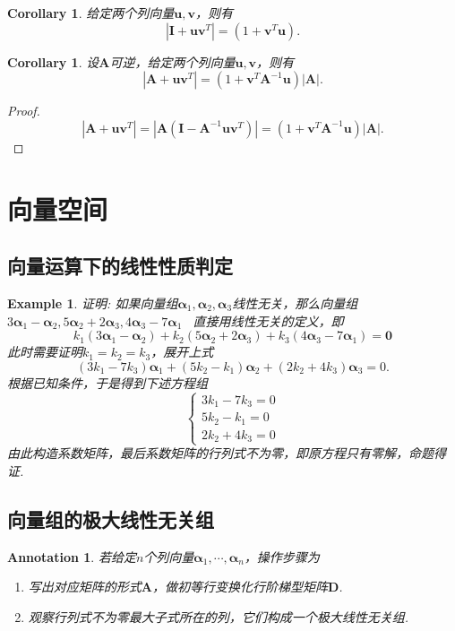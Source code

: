 \documentclass{article}
\newtheorem{corollary}[theorem]{Corollary}
\newtheorem{example}[theorem]{Example}
\newtheorem{annotation}[theorem]{Annotation}
\newcommand{\hints}{{\color{blue} \text{hints}}}
\newcommand{\mbf}[1]{\bm{#1}}
\begin{document}
\begin{corollary}
\rm 给定两个列向量$\mbf{u},\mbf{v}$，则有
$$
|\mbf{I} + \mbf{u}\mbf{v}^{T}| = (1 + \mbf{v}^{T}\mbf{u}). 
$$
\end{corollary}

\begin{corollary}
\rm 设$\mbf{A}$可逆，给定两个列向量$\mbf{u},\mbf{v}$，则有
$$
|\mbf{A} + \mbf{u}\mbf{v}^{T}| = (1+\mbf{v}^{T}\mbf{A}^{-1}\mbf{u})|\mbf{A}|.
$$
\end{corollary}

\begin{proof}
\rm 
$$
|\mbf{A} + \mbf{u}\mbf{v}^{T}| = |\mbf{A}(\mbf{I} - \mbf{A}^{-1}\mbf{u}\mbf{v}^{T})| = (1+\mbf{v}^{T}\mbf{A}^{-1}\mbf{u})|\mbf{A}|.
$$
\end{proof}

\newpage
\section{向量空间}

\subsection{向量运算下的线性性质判定}

\begin{example}
\rm 证明: 如果向量组$\mbf{\alpha}_1,\mbf{\alpha}_2,\mbf{\alpha}_3$线性无关，那么向量组$3\mbf{\alpha}_1-\mbf{\alpha}_2,5\mbf{\alpha}_2 + 2\mbf{\alpha}_3, 4\mbf{\alpha}_3-7\mbf{\alpha}_1$
\hints\ 直接用线性无关的定义，即
$$
k_1(3\mbf{\alpha}_1-\mbf{\alpha}_2) + k_2(5\mbf{\alpha}_2 + 2\mbf{\alpha}_3)+ k_3(4\mbf{\alpha}_3-7\mbf{\alpha}_1) = \mbf{0}
$$
此时需要证明$k_1 = k_2 = k_3$，展开上式
$$
(3k_1-7k_3)\mbf{\alpha}_1 + (5k_2 - k_1)\mbf{\alpha}_2 + (2k_2 +4k_3)\mbf{\alpha}_3 = 0. 
$$
根据已知条件，于是得到下述方程组
$$
\left \{
\begin{array}{ll}
3k_1-7k_3  = 0 \\
5k_2 - k_1 = 0 \\
2k_2 +4k_3 = 0
\end{array} \right.
$$
由此构造系数矩阵，最后系数矩阵的行列式不为零，即原方程只有零解，命题得证. 
\end{example}

\subsection{向量组的极大线性无关组}

\begin{annotation}
\rm 若给定$n$个列向量$\mbf{\alpha}_1,\cdots,\mbf{\alpha}_n$，操作步骤为
\begin{enumerate}
	\item 写出对应矩阵的形式$\mbf{A}$，做初等行变换化行阶梯型矩阵$\mbf{D}$.
	\item 观察行列式不为零最大子式所在的列，它们构成一个极大线性无关组. 
\end{enumerate}
\end{annotation}
\end{document}
